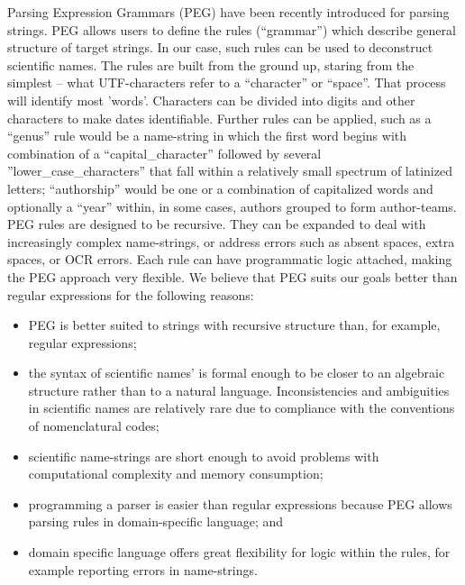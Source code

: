 \documentclass{bmcart}
\begin{document}
Parsing Expression Grammars (PEG) \cite{Ford2004} have been recently introduced for parsing strings. PEG allows users to define the rules (``grammar'') which describe general structure
of target strings. In our case, such rules can be used to deconstruct scientific names.
The rules are built from the ground up, staring from the simplest -- what UTF-characters refer to a ``character'' or ``space''.  That process will identify most 'words'.  Characters can be divided into digits and other characters to make dates identifiable. Further rules can be applied, such as a ``genus'' rule would be a name-string in which the first word begins with combination of a
``capital\_character'' followed by several ''lower\_case\_characters'' that fall within a relatively small spectrum of latinized letters;  
``authorship'' would be one or a combination of capitalized words and optionally a ``year'' within, in some cases, authors grouped to form author-teams. PEG rules are designed to be recursive. They can be expanded to deal with increasingly complex name-strings, or address errors such as absent spaces, extra spaces, or OCR errors. Each rule can have programmatic logic attached, making the PEG approach very flexible. We believe that PEG suits our goals
better than regular expressions for the following reasons:

\begin{itemize}

  \item PEG is better suited to strings with recursive structure than, for example, regular expressions;

  \item the syntax of scientific names' is formal enough to be closer to an algebraic
    structure rather than to a natural language. Inconsistencies and
    ambiguities in scientific names are relatively rare due to compliance with the conventions of nomenclatural codes;

  \item scientific name-strings are short enough to avoid problems with
    computational complexity and memory consumption;

  \item programming a parser is easier than regular expressions because
    PEG allows parsing rules in domain-specific language; and

  \item domain specific language offers great flexibility for logic within
    the rules, for example reporting errors in name-strings.

\end{itemize}
\end{document}
